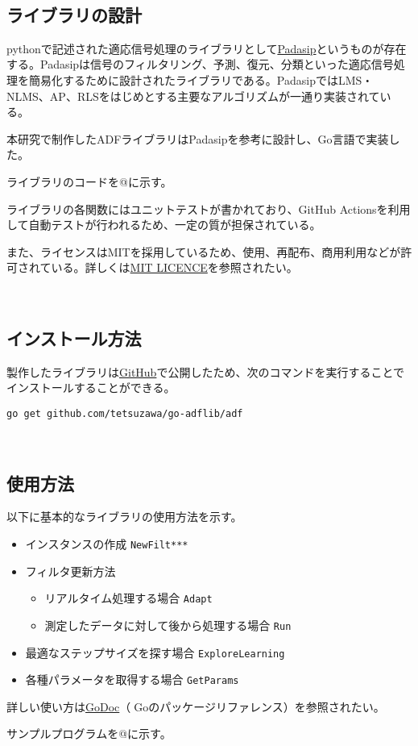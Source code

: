 \
\subsection{ライブラリの設計}\label{design-adf}

pythonで記述された適応信号処理のライブラリとして\href{https://matousc89.github.io/padasip/index.html\#padasip}{Padasip}というものが存在する。Padasipは信号のフィルタリング、予測、復元、分類といった適応信号処理を簡易化するために設計されたライブラリである。PadasipではLMS・NLMS、AP、RLSをはじめとする主要なアルゴリズムが一通り実装されている。

本研究で制作したADFライブラリはPadasipを参考に設計し、Go言語で実装した。

ライブラリのコードを@に示す。

ライブラリの各関数にはユニットテストが書かれており、GitHub
Actionsを利用して自動テストが行われるため、一定の質が担保されている。

また、ライセンスはMITを採用しているため、使用、再配布、商用利用などが許可されている。詳しくは\href{https://raw.githubusercontent.com/tetsuzawa/go-adflib/master/LICENSE}{MIT
LICENCE}を参照されたい。

\
\subsection{インストール方法}\label{how-to-install}

製作したライブラリは\href{https://github.com/tetsuzawa/go-adflib}{GitHub}で公開したため、次のコマンドを実行することでインストールすることができる。

\texttt{go\ get\ github.com/tetsuzawa/go-adflib/adf}

\
\subsection{使用方法}\label{how-to-use}

以下に基本的なライブラリの使用方法を示す。

\begin{itemize}
\tightlist
\item
  インスタンスの作成 \texttt{NewFilt***}
\item
  フィルタ更新方法

  \begin{itemize}
  \tightlist
  \item
    リアルタイム処理する場合 \texttt{Adapt}
  \item
    測定したデータに対して後から処理する場合 \texttt{Run}
  \end{itemize}
\item
  最適なステップサイズを探す場合 \texttt{ExploreLearning}
\item
  各種パラメータを取得する場合 \texttt{GetParams}
\end{itemize}

詳しい使い方は\href{https://godoc.org/github.com/tetsuzawa/go-adflib}{GoDoc}（Goのパッケージリファレンス）を参照されたい。

サンプルプログラムを@に示す。
